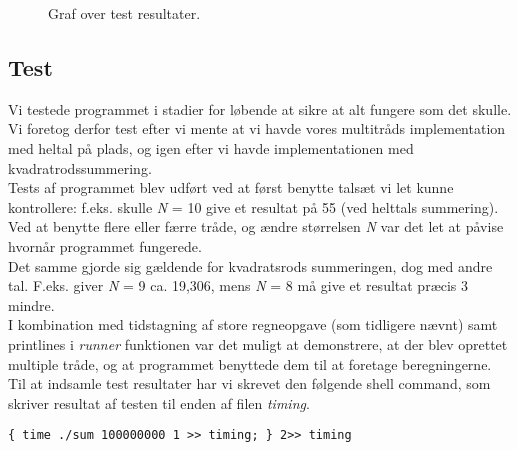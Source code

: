 \documentclass[main.tex]{subfile}
\begin{document}
\begin{figure}[H]
\center
{}
\caption{Graf over test resultater.}
\label{fig:opg2_1test}
\end{figure}

\subsection{Test}
Vi testede programmet i stadier for løbende at sikre at alt fungere som det skulle. Vi foretog derfor test efter vi mente at vi havde vores multitråds implementation med heltal på plads, og igen efter vi havde implementationen med kvadratrodssummering.\\

Tests af programmet blev udført ved at først benytte talsæt vi let kunne kontrollere: f.eks. skulle \textit{N} = 10 give et resultat på 55 (ved helttals summering). Ved at benytte flere eller færre tråde, og ændre størrelsen \textit{N} var det let at påvise hvornår programmet fungerede.\\

Det samme gjorde sig gældende for kvadratsrods summeringen, dog med andre tal. F.eks. giver \textit{N} = 9 ca. 19,306, mens \textit{N} = 8 må give et resultat præcis 3 mindre.\\

I kombination med tidstagning af store regneopgave (som tidligere nævnt) samt printlines i \textit{runner} funktionen var det muligt at demonstrere, at der blev oprettet multiple tråde, og at programmet benyttede dem til at foretage beregningerne.\\

Til at indsamle test resultater har vi skrevet den følgende shell command, som skriver resultat af testen til enden af filen \emph{timing}. \\
\begin{center}
\begin{minipage}{0.8\textwidth}
\begin{lstlisting}
{ time ./sum 100000000 1 >> timing; } 2>> timing
\end{lstlisting}
\end{minipage}
\end{center}
\end{document}
